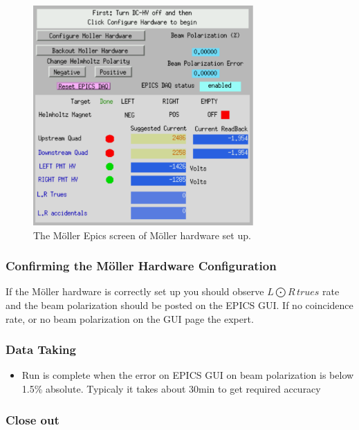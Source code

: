 \begin{figure}
\begin{center}
\includegraphics[width=0.75\textwidth]{moller_window.pdf}

\caption{The M{\"o}ller Epics screen of M{\"o}ller hardware
set up. \label{moller_epics_setup}}
\end{center}
\end{figure}


\subsubsection{Confirming the M{\"o}ller Hardware Configuration}

If the M{\"o}ller hardware is correctly set up you should observe
$L\bigodot R\, trues$ rate and the beam polarization should be posted
on the EPICS GUI. If no coincidence rate, or no beam polarization
on the GUI page the expert.


\subsubsection{Data Taking}

\begin{itemize}
\item Run is complete when the error on EPICS GUI on beam polarization is below
1.5\% absolute. Typicaly it takes about 30min to get required accuracy
\end{itemize}

\subsubsection{Close out\label{moller close out}}

